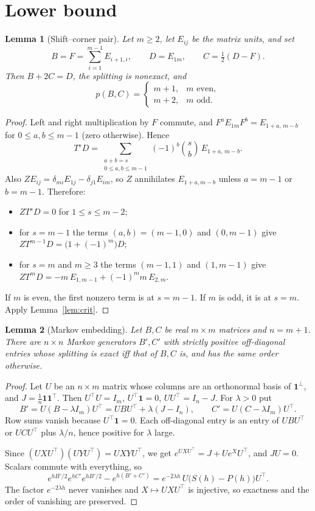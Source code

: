 \documentclass[11pt]{article}
\newtheorem{lemma}{Lemma}
\theoremstyle{remark}
\newcommand{\one}{\mathbf{1}}
\begin{document}
\section{Lower bound}

\begin{lemma}[Shift--corner pair]\label{lem:shift}
Let $m\ge2$, let $E_{ij}$ be the matrix units, and set
$$
B=F=\sum_{i=1}^{m-1}E_{i+1,i},\qquad D=E_{1m},\qquad C=\tfrac12(D-F).
$$
Then $B+2C=D$, the splitting is nonexact, and
$$
p(B,C)=\begin{cases}m+1,&m\text{ even},\\ m+2,&m\text{ odd}.\end{cases}
$$
\end{lemma}

\begin{proof}
Left and right multiplication by $F$ commute, and
$F^{a}E_{1m}F^{b}=E_{1+a,\,m-b}$ for $0\le a,b\le m-1$ (zero otherwise).
Hence
$$
T^{s}D=\sum_{\substack{a+b=s\\0\le a,b\le m-1}}(-1)^{b}\binom sb\,
E_{1+a,\,m-b}.
$$
Also $ZE_{ij}=\delta_{mi}E_{1j}-\delta_{j1}E_{im}$, so $Z$ annihilates
$E_{1+a,m-b}$ unless $a=m-1$ or $b=m-1$. Therefore:
\begin{itemize}
\item $ZT^{s}D=0$ for $1\le s\le m-2$;
\item for $s=m-1$ the terms $(a,b)=(m-1,0)$ and $(0,m-1)$ give
$ZT^{m-1}D=\bigl(1+(-1)^{m}\bigr)D$;
\item for $s=m$ and $m\ge 3$ the terms $(m-1,1)$ and $(1,m-1)$ give
$ZT^{m}D=-m\,E_{1,m-1}+(-1)^{m}m\,E_{2,m}$.
\end{itemize}
If $m$ is even, the first nonzero term is at $s=m-1$. If $m$ is odd, it
is at $s=m$. Apply Lemma~\ref{lem:crit}.
\end{proof}

\begin{lemma}[Markov embedding]\label{lem:embed}
Let $B,C$ be real $m\times m$ matrices and $n=m+1$. There are
$n\times n$ Markov generators $B',C'$ with strictly positive
off-diagonal entries whose splitting is exact iff that of $B,C$ is, and
has the same order otherwise.
\end{lemma}

\begin{proof}
Let $U$ be an $n\times m$ matrix whose columns are an orthonormal basis
of $\one^\perp$, and $J=\frac1n\one\one^{\top}$. Then
$U^{\top}U=I_m$, $U^{\top}\one=0$, $UU^{\top}=I_n-J$. For $\lambda>0$ put
$$
B'=U(B-\lambda I_m)U^{\top}=UBU^{\top}+\lambda(J-I_n),\qquad
C'=U(C-\lambda I_m)U^{\top}.
$$
Row sums vanish because $U^{\top}\one=0$. Each off-diagonal entry is an
entry of $UBU^{\top}$ or $UCU^{\top}$ plus $\lambda/n$, hence positive
for $\lambda$ large.

Since $(UXU^{\top})(UYU^{\top})=UXYU^{\top}$, we get
$e^{UXU^{\top}}=J+Ue^{X}U^{\top}$, and $JU=0$. Scalars commute with
everything, so
$$
e^{hB'/2}e^{hC'}e^{hB'/2}-e^{h(B'+C')}
=e^{-2\lambda h}\,U\bigl(S(h)-P(h)\bigr)U^{\top}.
$$
The factor $e^{-2\lambda h}$ never vanishes and $X\mapsto UXU^{\top}$ is
injective, so exactness and the order of vanishing are preserved.
\end{proof}
\end{document}
